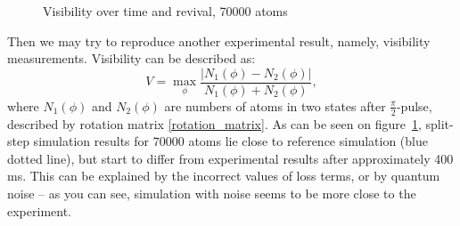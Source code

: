 \documentclass[12pt,notitlepage]{report}
\begin{document}
\begin{figure}
\begin{center}
\qquad
{}
\end{center}
\caption{Visibility over time and revival, 70000 atoms}
\label{visibility_vs_reference}
\end{figure}

Then we may try to reproduce another experimental result, namely, visibility measurements. Visibility can be described as:
\[ V = \max_{\phi} \frac{\vert N_1(\phi) - N_2(\phi) \vert}{N_1(\phi) + N_2(\phi)}, \]
where $N_1(\phi)$ and $N_2(\phi)$ are numbers of atoms in two states after $\frac{\pi}{2}$-pulse, described by rotation matrix \ref{rotation_matrix}. As can be seen on figure~\ref{visibility_vs_reference}, split-step simulation results for 70000 atoms lie close to reference simulation (blue dotted line), but start to differ from experimental results after approximately 400 ms. This can be explained by the incorrect values of loss terms, or by quantum noise -- as you can see, simulation with noise seems to be more close to the experiment.
\end{document}
